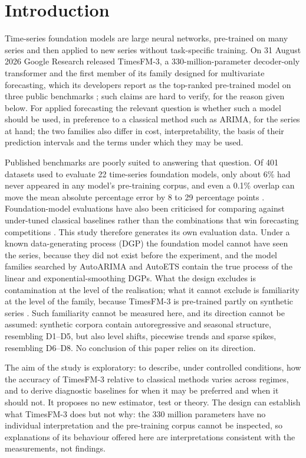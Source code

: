 \section{Introduction}
\label{sec:intro}

Time-series foundation models are large neural networks, pre-trained on many series and then applied
to new series without task-specific training. On 31 August 2026 Google Research released TimesFM-3, a
330-million-parameter decoder-only transformer and the first member of its family designed for
multivariate forecasting, which its developers report as the top-ranked pre-trained model on three
public benchmarks \citep{timesfm3blog}; such claims are hard to verify, for the reason given below. For
applied forecasting the relevant question is whether such a model should be used, in preference to a
classical method such as ARIMA, for the series at hand; the two families also differ in cost,
interpretability, the basis of their prediction intervals and the terms under which they may be used.

Published benchmarks are poorly suited to answering that question. Of 401 datasets used to evaluate
22 time-series foundation models, only about 6\% had never appeared in any model's pre-training
corpus, and even a 0.1\% overlap can move the mean absolute percentage error by 8 to 29 percentage
points \citep{meyer2025leakage}. Foundation-model evaluations have also been criticised for comparing
against under-tuned classical baselines rather than the combinations that win forecasting competitions
\citep{makridakis2020m4}. This study therefore generates its own evaluation data. Under a known
data-generating process (DGP) the foundation model cannot have seen the series, because they did not
exist before the experiment, and the model families searched by AutoARIMA and AutoETS contain the true
process of the linear and exponential-smoothing DGPs. What the design excludes is contamination at the
level of the realisation; what it cannot exclude is familiarity at the level of the family, because
TimesFM-3 is pre-trained partly on synthetic series \citep{timesfm3blog}. Such familiarity cannot be
measured here, and its direction cannot be assumed: synthetic corpora contain autoregressive and seasonal
structure, resembling D1--D5, but also level shifts, piecewise trends and sparse spikes, resembling
D6--D8. No conclusion of this paper relies on its direction.

The aim of the study is exploratory: to describe, under controlled conditions, how the accuracy of
TimesFM-3 relative to classical methods varies across regimes, and to derive diagnostic baselines for
when it may be preferred and when it should not. It proposes no new estimator, test or theory. The
design can establish what TimesFM-3 does but not why: the 330 million parameters have no individual
interpretation and the pre-training corpus cannot be inspected, so explanations of its behaviour offered
here are interpretations consistent with the measurements, not findings.

